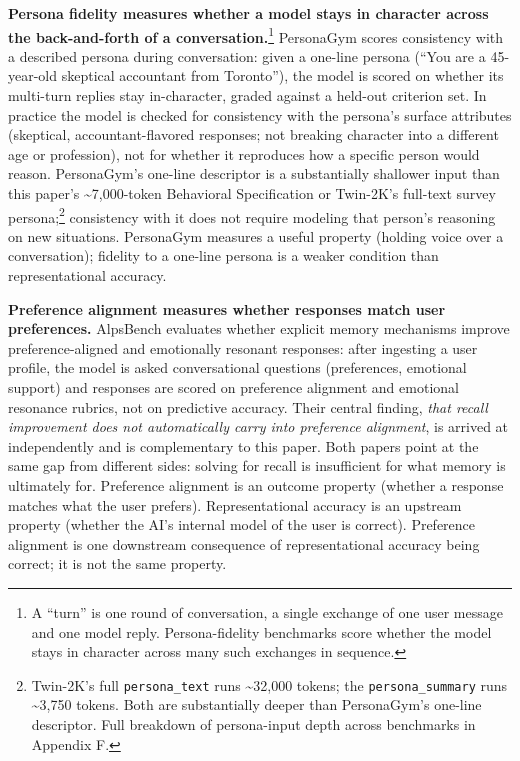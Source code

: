 \textbf{Persona fidelity measures whether a model stays in character
across the back-and-forth of a conversation.}\footnote{A ``turn'' is one
  round of conversation, a single exchange of one user message and one
  model reply. Persona-fidelity benchmarks score whether the model stays
  in character across many such exchanges in sequence.} PersonaGym
\citep{samuel2025personagym} scores
consistency with a described persona during conversation: given a
one-line persona (``You are a 45-year-old skeptical accountant from
Toronto''), the model is scored on whether its multi-turn replies stay
in-character, graded against a held-out criterion set. In practice the
model is checked for consistency with the persona's surface attributes
(skeptical, accountant-flavored responses; not breaking character into a
different age or profession), not for whether it reproduces how a
specific person would reason. PersonaGym's one-line descriptor is a
substantially shallower input than this paper's
\textasciitilde7,000-token Behavioral Specification or Twin-2K's
full-text survey persona;\footnote{Twin-2K's full \texttt{persona\_text}
  runs \textasciitilde32,000 tokens; the \texttt{persona\_summary} runs
  \textasciitilde3,750 tokens. Both are substantially deeper than
  PersonaGym's one-line descriptor. Full breakdown of persona-input
  depth across benchmarks in Appendix F.} consistency with it does not
require modeling that person's reasoning on new situations. PersonaGym
measures a useful property (holding voice over a conversation); fidelity
to a one-line persona is a weaker condition than representational
accuracy.

\textbf{Preference alignment measures whether responses match user
preferences.} AlpsBench \citep{xiao2026alpsbench} evaluates
whether explicit memory mechanisms improve preference-aligned and
emotionally resonant responses: after ingesting a user profile, the
model is asked conversational questions (preferences, emotional support)
and responses are scored on preference alignment and emotional resonance
rubrics, not on predictive accuracy. Their central finding, \emph{that
recall improvement does not automatically carry into preference
alignment}, is arrived at independently and is complementary to this
paper. Both papers point at the same gap from different sides: solving
for recall is insufficient for what memory is ultimately for. Preference
alignment is an outcome property (whether a response matches what the
user prefers). Representational accuracy is an upstream property
(whether the AI's internal model of the user is correct). Preference
alignment is one downstream consequence of representational accuracy
being correct; it is not the same property.

